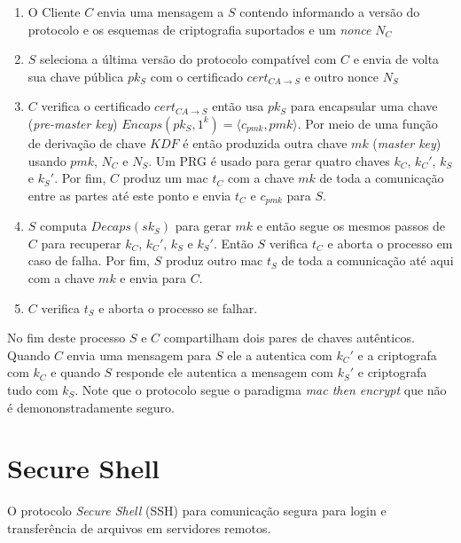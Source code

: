 \begin{enumerate}
\item O Cliente $C$ envia uma mensagem a $S$ contendo informando a versão do protocolo e os esquemas de criptografia suportados e um {\em nonce} $N_C$
\item $S$ seleciona a última versão do protocolo compatível com $C$ e envia de volta sua chave pública $pk_S$ com o certificado $cert_{CA \to S}$ e outro nonce $N_S$
\item $C$ verifica o certificado $cert_{CA \to S}$ então usa $pk_S$ para encapsular uma chave ({\em pre-master key}) $Encaps(pk_S, 1^k) = \langle c_{pmk}, pmk \rangle$.
  Por meio de uma função de derivação de chave $KDF$ é então produzida outra chave $mk$ ({\em master key}) usando $pmk$, $N_C$ e $N_S$.
Um PRG é usado para gerar quatro chaves $k_C$, $k_C'$, $k_S$ e $k_S'$.
Por fim, $C$ produz um mac $t_C$ com a chave $mk$ de toda a comunicação entre as partes até este ponto e envia $t_C$ e $c_{pmk}$ para $S$.
\item $S$ computa $Decaps(sk_S)$ para gerar $mk$ e então segue os mesmos passos de $C$ para recuperar $k_C$, $k_C'$, $k_S$ e $k_S'$.
Então $S$ verifica $t_C$ e aborta o processo em caso de falha.
Por fim, $S$ produz outro mac $t_S$ de toda a comunicação até aqui com a chave $mk$ e envia para $C$.
\item $C$ verifica $t_S$ e aborta o processo se falhar.
\end{enumerate}


No fim deste processo $S$ e $C$ compartilham dois pares de chaves autênticos.
Quando $C$ envia uma mensagem para $S$ ele a autentica com $k_C'$ e a criptografa com $k_C$ e quando $S$ responde ele autentica a mensagem com $k_S'$ e criptografa tudo com $k_S$.
Note que o protocolo segue o paradigma {\em mac then encrypt} que não é demononstradamente seguro.


\section{Secure Shell}
\label{sec:ssh}

O protocolo {\em Secure Shell} (SSH) para comunicação segura para login e transferência de arquivos em servidores remotos.

